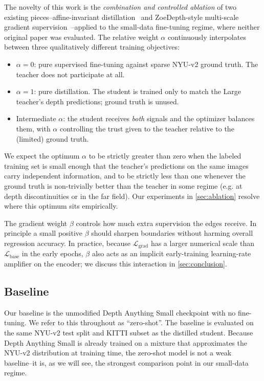 \documentclass[10pt,twocolumn,letterpaper]{article}
\begin{document}
The novelty of this work is the \emph{combination and controlled
ablation} of two existing pieces--affine-invariant
distillation~\cite{he2025distillanydepth} and ZoeDepth-style multi-scale
gradient supervision~\cite{bhat2023zoedepth}--applied to the small-data
fine-tuning regime, where neither original paper was evaluated. The
relative weight $\alpha$ continuously interpolates between three
qualitatively different training objectives:
\begin{itemize}
\item $\alpha=0$: pure supervised fine-tuning against sparse NYU-v2
ground truth. The teacher does not participate at all.
\item $\alpha=1$: pure distillation. The student is trained only to
match the Large teacher's depth predictions; ground truth is unused.
\item Intermediate $\alpha$: the student receives \emph{both} signals
and the optimizer balances them, with $\alpha$ controlling the
trust given to the teacher relative to the (limited) ground truth.
\end{itemize}
We expect the optimum $\alpha$ to be strictly greater than zero when the
labeled training set is small enough that the teacher's predictions on
the same images carry independent information, and to be strictly less
than one whenever the ground truth is non-trivially better than the
teacher in some regime (e.g. at depth discontinuities or in the far
field). Our experiments in \cref{sec:ablation} resolve where this
optimum sits empirically.

The gradient weight $\beta$ controls how much extra supervision the
edges receive. In principle a small positive $\beta$ should sharpen
boundaries without harming overall regression accuracy. In practice,
because $\mathcal{L}_{\text{grad}}$ has a larger numerical scale than
$\mathcal{L}_{\text{base}}$ in the early epochs, $\beta$ also acts as
an implicit early-training learning-rate amplifier on the encoder; we
discuss this interaction in \cref{sec:conclusion}.

\subsection{Baseline}
\label{sec:baseline}

Our baseline is the unmodified Depth Anything Small checkpoint with no
fine-tuning. We refer to this throughout as ``zero-shot''. The baseline
is evaluated on the same NYU-v2 test split and KITTI subset as the
distilled student. Because Depth Anything Small is already trained on a
mixture that approximates the NYU-v2 distribution at training time, the
zero-shot model is not a weak baseline--it is, as we will see, the
strongest comparison point in our small-data regime.
\end{document}
